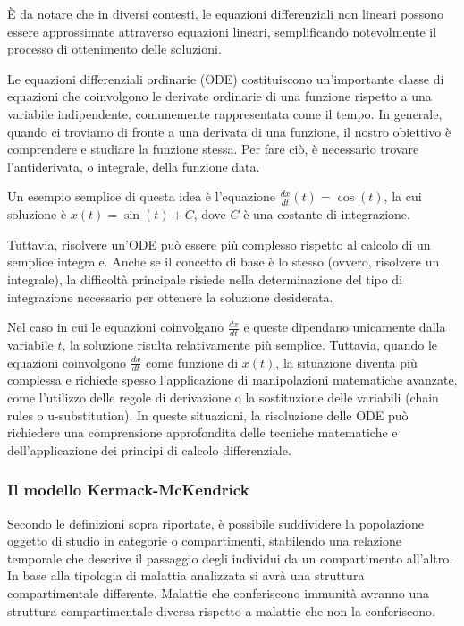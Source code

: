 È da notare che in diversi contesti, le equazioni differenziali non 
lineari possono essere approssimate attraverso equazioni lineari, 
semplificando notevolmente il processo di ottenimento delle soluzioni.

Le equazioni differenziali ordinarie (ODE) costituiscono un'importante 
classe di equazioni che coinvolgono le derivate ordinarie di una funzione 
rispetto a una variabile indipendente, comunemente rappresentata come il 
tempo. In generale, quando ci troviamo di fronte a una derivata di una 
funzione, il nostro obiettivo è comprendere e studiare la funzione stessa. 
Per fare ciò, è necessario trovare l'antiderivata, o integrale, della 
funzione data.

Un esempio semplice di questa idea è l'equazione 
$\frac{dx}{dt}(t) = \cos(t)$, la cui soluzione è $x(t) = \sin(t) + C$, 
dove $C$ è una costante di integrazione.

Tuttavia, risolvere un'ODE può essere più complesso rispetto al calcolo 
di un semplice integrale. Anche se il concetto di base è lo stesso 
(ovvero, risolvere un integrale), la difficoltà principale risiede 
nella determinazione del tipo di integrazione necessario per ottenere 
la soluzione desiderata.

Nel caso in cui le equazioni coinvolgano $\frac{dx}{dt}$ e queste 
dipendano unicamente dalla variabile $t$, la soluzione risulta 
relativamente più semplice. Tuttavia, quando le equazioni coinvolgono 
$\frac{dx}{dt}$ come funzione di $x(t)$, la situazione diventa più 
complessa e richiede spesso l'applicazione di manipolazioni matematiche 
avanzate, come l'utilizzo delle regole di derivazione o la sostituzione 
delle variabili (chain rules o u-substitution). In queste situazioni, 
la risoluzione delle ODE può richiedere una comprensione approfondita 
delle tecniche matematiche e dell'applicazione dei principi di calcolo 
differenziale.

\subsubsection{Il modello Kermack-McKendrick}

Secondo le definizioni sopra riportate, è possibile suddividere la 
popolazione oggetto di studio in categorie o compartimenti, stabilendo 
una relazione temporale che descrive il passaggio degli individui da un 
compartimento all'altro. In base alla tipologia di malattia analizzata
si avrà una struttura compartimentale differente. Malattie che conferiscono 
immunità avranno una struttura compartimentale diversa rispetto a 
malattie che non la conferiscono.

